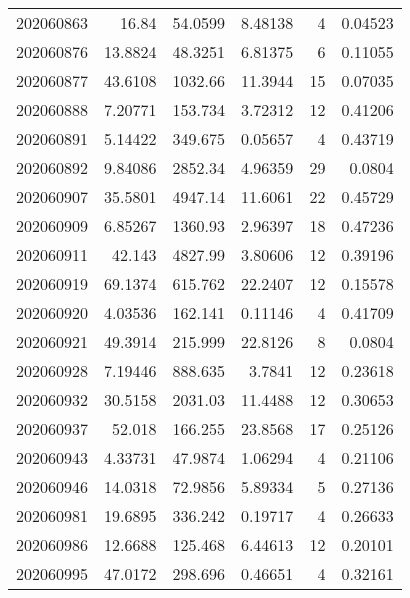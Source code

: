 \begin{tabular}{rrrrrr}
 202060863 &         16.84    &       54.0599 &            8.48138 &           4 & 0.04523 \\
 202060876 &         13.8824  &       48.3251 &            6.81375 &           6 & 0.11055 \\
 202060877 &         43.6108  &     1032.66   &           11.3944  &          15 & 0.07035 \\
 202060888 &          7.20771 &      153.734  &            3.72312 &          12 & 0.41206 \\
 202060891 &          5.14422 &      349.675  &            0.05657 &           4 & 0.43719 \\
 202060892 &          9.84086 &     2852.34   &            4.96359 &          29 & 0.0804  \\
 202060907 &         35.5801  &     4947.14   &           11.6061  &          22 & 0.45729 \\
 202060909 &          6.85267 &     1360.93   &            2.96397 &          18 & 0.47236 \\
 202060911 &         42.143   &     4827.99   &            3.80606 &          12 & 0.39196 \\
 202060919 &         69.1374  &      615.762  &           22.2407  &          12 & 0.15578 \\
 202060920 &          4.03536 &      162.141  &            0.11146 &           4 & 0.41709 \\
 202060921 &         49.3914  &      215.999  &           22.8126  &           8 & 0.0804  \\
 202060928 &          7.19446 &      888.635  &            3.7841  &          12 & 0.23618 \\
 202060932 &         30.5158  &     2031.03   &           11.4488  &          12 & 0.30653 \\
 202060937 &         52.018   &      166.255  &           23.8568  &          17 & 0.25126 \\
 202060943 &          4.33731 &       47.9874 &            1.06294 &           4 & 0.21106 \\
 202060946 &         14.0318  &       72.9856 &            5.89334 &           5 & 0.27136 \\
 202060981 &         19.6895  &      336.242  &            0.19717 &           4 & 0.26633 \\
 202060986 &         12.6688  &      125.468  &            6.44613 &          12 & 0.20101 \\
 202060995 &         47.0172  &      298.696  &            0.46651 &           4 & 0.32161 \\

\end{tabular}
